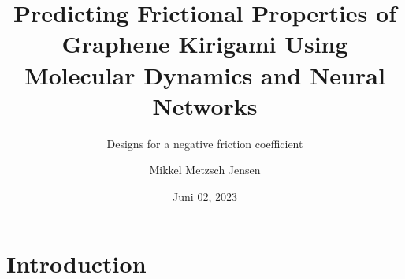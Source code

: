 \documentclass[
	10pt, %
]{beamer}
\title[Predicting Graphene Kirigami Friction]{Predicting Frictional Properties of Graphene Kirigami Using Molecular Dynamics and Neural Networks} %
\subtitle{Designs for a negative friction coefficient}
\author[Mikkel Metzsch Jensen]{Mikkel Metzsch Jensen} %
\institute[UiO]{University of Oslo} %
\date[Juni 02, 2023]{Juni 02, 2023}
\begin{document}

\begin{frame}
	\titlepage %
\end{frame}



	




\section{Introduction}
\end{document}
